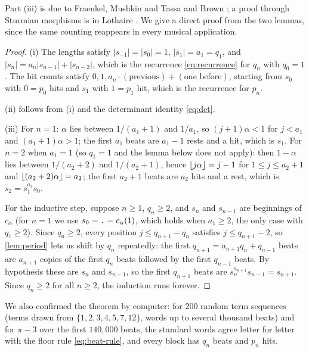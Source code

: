 Part (iii) is due to Fraenkel, Mushkin and Tassa \citep{FraenkelMushkinTassa1978} and Brown \citep{Brown1993}; a proof through Sturmian morphisms is in Lothaire \citep[Ch.~2]{Lothaire2002}. We give a direct proof from the two lemmas, since the same counting reappears in every musical application.

\begin{proof}
(i) The lengths satisfy $|s_{-1}| = |s_0| = 1$, $|s_1| = a_1 = q_1$, and $|s_n| = a_n |s_{n-1}| + |s_{n-2}|$, which is the recurrence \eqref{eq:recurrence} for $q_n$ with $q_0 = 1$. The hit counts satisfy $0, 1, a_n \cdot (\text{previous}) + (\text{one before})$, starting from $s_0$ with $0 = p_0$ hits and $s_1$ with $1 = p_1$ hit, which is the recurrence for $p_n$.

(ii) follows from (i) and the determinant identity \eqref{eq:det}.

(iii) For $n = 1$: $\alpha$ lies between $1/(a_1 + 1)$ and $1/a_1$, so $(j+1)\alpha < 1$ for $j < a_1$ and $(a_1 + 1)\alpha > 1$; the first $a_1$ beats are $a_1 - 1$ rests and a hit, which is $s_1$. For $n = 2$ when $a_1 = 1$ (so $q_1 = 1$ and the lemma below does not apply): then $1 - \alpha$ lies between $1/(a_2 + 2)$ and $1/(a_2+1)$, hence $\left\lfloor j\alpha\right\rfloor = j - 1$ for $1 \le j \le a_2 + 1$ and $\left\lfloor (a_2 + 2)\alpha\right\rfloor = a_2$; the first $a_2 + 1$ beats are $a_2$ hits and a rest, which is $s_2 = s_1^{a_2} s_0$.

For the inductive step, suppose $n \ge 1$, $q_n \ge 2$, and $s_n$ and $s_{n-1}$ are beginnings of $c_\alpha$ (for $n = 1$ we use $s_0 = \texttt{.} = c_\alpha(1)$, which holds when $a_1 \ge 2$, the only case with $q_1 \ge 2$). Since $q_n \ge 2$, every position $j \le q_{n+1} - q_n$ satisfies $j \le q_{n+1} - 2$, so \cref{lem:period} lets us shift by $q_n$ repeatedly: the first $q_{n+1} = a_{n+1} q_n + q_{n-1}$ beats are $a_{n+1}$ copies of the first $q_n$ beats followed by the first $q_{n-1}$ beats. By hypothesis these are $s_n$ and $s_{n-1}$, so the first $q_{n+1}$ beats are $s_n^{a_{n+1}} s_{n-1} = s_{n+1}$. Since $q_n \ge 2$ for all $n \ge 2$, the induction runs forever.
\end{proof}

We also confirmed the theorem by computer: for 200 random term sequences (terms drawn from $\{1,2,3,4,5,7,12\}$, words up to several thousand beats) and for $\pi - 3$ over the first $140{,}000$ beats, the standard words agree letter for letter with the floor rule \eqref{eq:beat-rule}, and every block has $q_n$ beats and $p_n$ hits.


